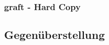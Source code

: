 \subsubsection{graft - Hard Copy}
\label{subsubsec:filelog - Hard Copy}

\subsection{Gegenüberstellung}
\label{subsec:Gegenüberstellung}

%
%
%
